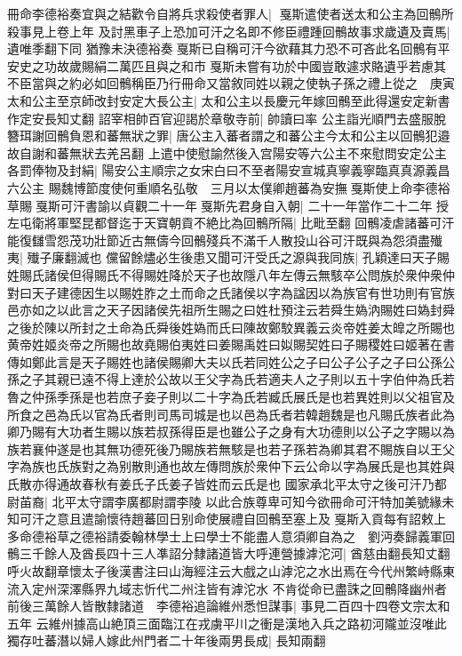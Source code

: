 冊命李德裕奏宜與之結歡令自將兵求殺使者罪人|{
	戛斯遣使者送太和公主為回鶻所殺事見上卷上年}
及討黑車子上恐加可汗之名即不修臣禮踵回鶻故事求歲遺及賣馬|{
	遺唯季翻下同}
猶豫未決德裕奏戛斯已自稱可汗今欲藉其力恐不可吝此名回鶻有平安史之功故歲賜絹二萬匹且與之和市戛斯未嘗有功於中國豈敢遽求賂遺乎若慮其不臣當與之約必如回鶻稱臣乃行冊命又當敘同姓以親之使執子孫之禮上從之　庚寅太和公主至京師改封安定大長公主|{
	太和公主以長慶元年嫁回鶻至此得還安定新書作定安長知丈翻}
詔宰相帥百官迎謁於章敬寺前|{
	帥讀曰率}
公主詣光順門去盛服脫簪珥謝回鶻負恩和蕃無狀之罪|{
	唐公主入蕃者謂之和蕃公主今太和公主以回鶻犯邉故自謝和蕃無狀去羌呂翻}
上遣中使慰諭然後入宫陽安等六公主不來慰問安定公主各罰俸物及封絹|{
	陽安公主順宗之女宋白曰不至者陽安宣城真寧義寧臨真真源義昌六公主}
賜魏博節度使何重順名弘敬　三月以太僕卿趙蕃為安撫戛斯使上命李德裕草賜戛斯可汗書諭以貞觀二十一年戛斯先君身自入朝|{
	二十一年當作二十二年}
授左屯衛將軍堅昆都督迄于天寶朝貢不絶比為回鶻所隔|{
	比毗至翻}
回鶻凌虐諸蕃可汗能復讎雪怨茂功壯節近古無儔今回鶻殘兵不滿千人散投山谷可汗既與為怨須盡殱夷|{
	殱子廉翻滅也}
儻留餘燼必生後患又聞可汗受氏之源與我同族|{
	孔穎達曰天子賜姓賜氏諸侯但得賜氏不得賜姓降於天子也故隱八年左傳云無駭卒公問族於衆仲衆仲對曰天子建德因生以賜姓胙之土而命之氏諸侯以字為諡因以為族官有世功則有官族邑亦如之以此言之天子因諸侯先祖所生賜之曰姓杜預注云若舜生媯汭賜姓曰媯封舜之後於陳以所封之土命為氏舜後姓媯而氏曰陳故鄭駮異義云炎帝姓姜太皥之所賜也黄帝姓姬炎帝之所賜也故堯賜伯夷姓曰姜賜禹姓曰姒賜契姓曰子賜稷姓曰姬著在書傳如鄭此言是天子賜姓也諸侯賜卿大夫以氏若同姓公之子曰公子公子之子曰公孫公孫之子其親已遠不得上達於公故以王父字為氏若適夫人之子則以五十字伯仲為氏若魯之仲孫季孫是也若庶子妾子則以二十字為氏若臧氏展氏是也若異姓則以父祖官及所食之邑為氏以官為氏者則司馬司城是也以邑為氏者若韓趙魏是也凡賜氏族者此為卿乃賜有大功者生賜以族若叔孫得臣是也雖公子之身有大功德則以公子之字賜以為族若襄仲遂是也其無功德死後乃賜族若無駭是也若子孫若為卿其君不賜族自以王父字為族也氏族對之為别散則通也故左傳問族於衆仲下云公命以字為展氏是也其姓與氏散亦得通故春秋有姜氏子氏姜子皆姓而云氏是也}
國家承北平太守之後可汗乃都尉苖裔|{
	北平太守謂李廣都尉謂李陵}
以此合族尊卑可知今欲冊命可汗特加美號緣未知可汗之意且遣諭懷待趙蕃回日别命使展禮自回鶻至塞上及戛斯入貢每有詔敕上多命德裕草之德裕請委翰林學士上曰學士不能盡人意須卿自為之　劉沔奏歸義軍回鶻三千餘人及酋長四十三人凖詔分隸諸道皆大呼連營據滹沱河|{
	酋慈由翻長知丈翻呼火故翻章懷太子後漢書注曰山海經注云大戲之山滹沱之水出焉在今代州繁峙縣東流入定州深澤縣界九域志忻代二州注皆有滹沱水}
不肯從命已盡誅之回鶻降幽州者前後三萬餘人皆散隸諸道　李德裕追論維州悉怛謀事|{
	事見二百四十四卷文宗太和五年}
云維州據高山絶頂三面臨江在戎虜平川之衝是漢地入兵之路初河隴並沒唯此獨存吐蕃潛以婦人嫁此州門者二十年後兩男長成|{
	長知兩翻}
